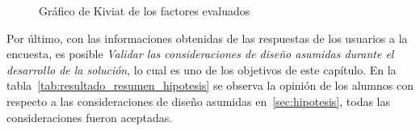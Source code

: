 \begin{figure}[H]
\centering
{}
\label{fig:subjetiva_kiviat}
\caption{Gráfico de Kiviat de los factores evaluados}
\end{figure}


Por último, con las informaciones obtenidas de las respuestas de los usuarios a la encuesta, es posible 
\emph{Validar las consideraciones de diseño asumidas
    durante el desarrollo de la solución}, lo cual es uno de los objetivos de
este capítulo. En la tabla~\ref{tab:resultado_resumen_hipotesis} se observa la
opinión de los alumnos con respecto a las consideraciones de diseño asumidas
en~\ref{sec:hipotesis}, todas las consideraciones fueron aceptadas.


